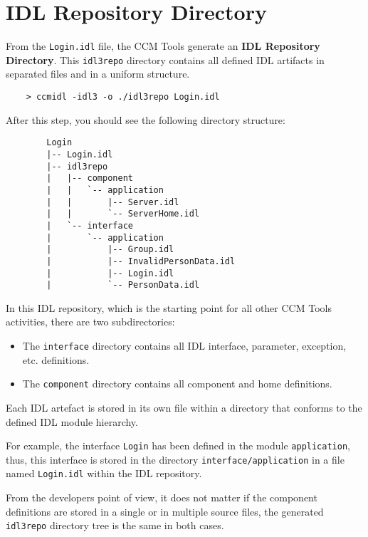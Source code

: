 \section{IDL Repository Directory}
\label{section:IdlRepositoryDirectory}

From the {\tt Login.idl} file, the CCM Tools generate an 
{\bf IDL Repository Directory}.
This {\tt idl3repo} directory contains all defined IDL artifacts in separated
files and in a uniform structure.
\begin{footnotesize}
\begin{verbatim}
	> ccmidl -idl3 -o ./idl3repo Login.idl
\end{verbatim}
\end{footnotesize}

After this step, you should see the following directory structure:
\begin{footnotesize}
\begin{verbatim}
        Login
        |-- Login.idl
        |-- idl3repo
        |   |-- component
        |   |   `-- application
        |   |       |-- Server.idl
        |   |       `-- ServerHome.idl
        |   `-- interface
        |       `-- application
        |           |-- Group.idl
        |           |-- InvalidPersonData.idl
        |           |-- Login.idl
        |           `-- PersonData.idl
\end{verbatim}
\end{footnotesize}

In this IDL repository, which is the starting point for all other CCM Tools
activities, there are two subdirectories:
\begin{itemize}
 	\item The {\tt interface} directory contains all IDL interface,
 	parameter, exception, etc. definitions.
 	  
  	\item The {\tt component} directory contains all component and
  	home definitions.
\end{itemize}

Each IDL artefact is stored in its own file within a directory that
conforms to the defined IDL module hierarchy.

\vspace{3mm}
For example, the interface {\tt Login} has been defined in the module 
{\tt application}, thus, this interface is stored in the directory 
{\tt interface/application} in a file named {\tt Login.idl} within the IDL 
repository.

\vspace{3mm}
From the developers point of view, it does not matter if the component
definitions are stored in a single or in multiple source files, the generated 
{\tt idl3repo} directory tree is the same in both cases.

 \newpage
